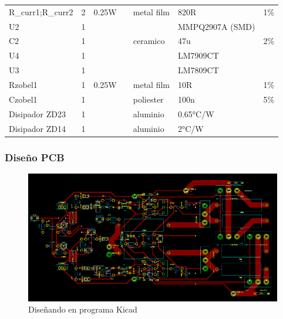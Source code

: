 \documentclass[a4paper,12pt,twoside]{article}
\begin{document}
\begin{table}[h!]
\begin{tabular}{@{}lllllll@{}}
R\_curr1;R\_curr2     & 2        &  0.25W    &           &  metal film& 820R     & 1\% \\
U2                    & 1        &           &           &            & MMPQ2907A (SMD) & \\
C2                    & 1        &           &           &  ceramico  & 47u      & 2\% \\
U4                    & 1        &           &           &            & LM7909CT &     \\
U3                    & 1        &           &           &            & LM7809CT &     \\
Rzobel1               & 1        &  0.25W    &           &  metal film& 10R      & 1\% \\
Czobel1               & 1        &           &           &  poliester & 100n     & 5\% \\ 
Disipador ZD23        & 1        &           &           &  aluminio  & 0.65°C/W &     \\  
Disipador ZD14        & 1        &           &           &  aluminio  & 2°C/W    &     \\ \bottomrule
\end{tabular}

\end{table}



\newpage
\subsubsection{Diseño PCB}

\begin{figure}[H]
    \centering
    \includegraphics[height=0.4\textwidth]{img/PCB/PCB_kicad}
    \caption{Diseñando en programa Kicad}
    \label{fig:pcb1}
\end{figure}
\end{document}
